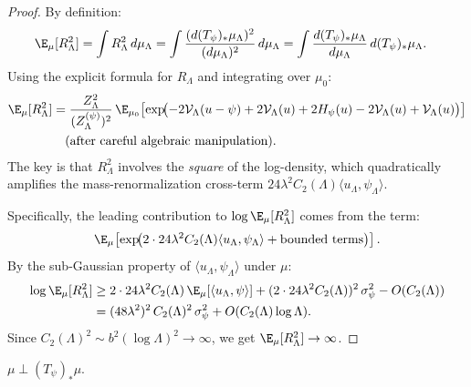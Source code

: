 \begin{proof}
By definition:
\begin{align*}
  \E_\mu[R_\Lambda^2]
  &= \int R_\Lambda^2\,d\mu_\Lambda
  = \int \frac{(d(T_\psi)_*\mu_\Lambda)^2}{(d\mu_\Lambda)^2}\,d\mu_\Lambda
  = \int \frac{d(T_\psi)_*\mu_\Lambda}{d\mu_\Lambda}\,d(T_\psi)_*\mu_\Lambda.
\end{align*}
Using the explicit formula for $R_\Lambda$ and integrating over $\mu_0$:
\begin{align*}
  \E_\mu[R_\Lambda^2]
  &= \frac{Z_\Lambda^2}{(Z_\Lambda^{(\psi)})^2}\,
  \E_{\mu_0}\!\left[\exp\!\bigl(
    -2\mathcal{V}_\Lambda(u-\psi) + 2\mathcal{V}_\Lambda(u)
    + 2H_\psi(u) - 2\mathcal{V}_\Lambda(u) + \mathcal{V}_\Lambda(u)
  \bigr)\right]  \\
  &\quad \text{(after careful algebraic manipulation).}
\end{align*}
The key is that $R_\Lambda^2$ involves the \emph{square} of the log-density,
which quadratically amplifies the mass-renormalization cross-term
$24\lambda^2 C_2(\Lambda)\langle u_\Lambda, \psi_\Lambda\rangle$.

Specifically, the leading contribution to $\log\E_\mu[R_\Lambda^2]$ comes
from the term:
\[
  \E_\mu\!\left[\exp\!\bigl(
    2 \cdot 24\lambda^2 C_2(\Lambda)\langle u_\Lambda, \psi_\Lambda\rangle
    + \text{bounded terms}
  \bigr)\right].
\]
By the sub-Gaussian property of $\langle u_\Lambda, \psi_\Lambda\rangle$ under $\mu$:
\begin{align*}
  \log\E_\mu[R_\Lambda^2]
  &\geq 2 \cdot 24\lambda^2 C_2(\Lambda)\,\E_\mu[\langle u_\Lambda,\psi\rangle]
    + (2 \cdot 24\lambda^2 C_2(\Lambda))^2\,\sigma_\psi^2
    - O(C_2(\Lambda)) \\
  &= (48\lambda^2)^2\,C_2(\Lambda)^2\,\sigma_\psi^2 + O(C_2(\Lambda)\log\Lambda).
\end{align*}
Since $C_2(\Lambda)^2 \sim b^2(\log\Lambda)^2 \to \infty$, we get
$\E_\mu[R_\Lambda^2] \to \infty$.
\end{proof}

\begin{theorem}\label{thm:singularity}
$\mu \perp (T_\psi)_*\mu$.
\end{theorem}

